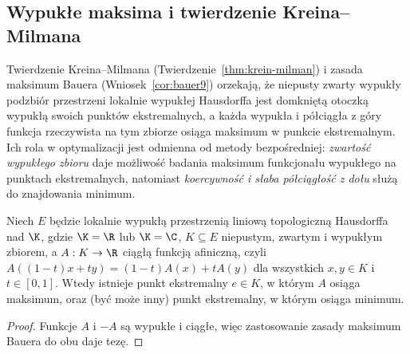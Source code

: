 \subsection{Wypukłe maksima i twierdzenie Kreina--Milmana}

Twierdzenie Kreina--Milmana (Twierdzenie~\ref{thm:krein-milman})
i zasada maksimum Bauera (Wniosek~\ref{cor:bauer9}) orzekają,
że niepusty zwarty wypukły podzbiór przestrzeni lokalnie wypukłej
Hausdorffa jest domkniętą otoczką wypukłą swoich punktów
ekstremalnych, a każda wypukła i półciągła z góry funkcja
rzeczywista na tym zbiorze osiąga maksimum w punkcie ekstremalnym. Ich rola w optymalizacji jest odmienna od metody bezpośredniej:
\emph{zwartość wypukłego zbioru} daje możliwość badania maksimum
funkcjonału wypukłego na punktach ekstremalnych,
natomiast \emph{koercywność i słaba półciągłość z dołu}
służą do znajdowania minimum.

\begin{stwierdzenie}
\label{prop:affine-extreme16}
Niech $E$ będzie lokalnie wypukłą przestrzenią liniową
topologiczną Hausdorffa nad $\K$, gdzie $\K=\R$ lub $\K=\C$,
$K\subseteq E$ niepustym, zwartym i wypukłym zbiorem,
a $A:K\to\R$ ciągłą funkcją afiniczną,
czyli $A((1-t)x+ty)=(1-t)A(x)+tA(y)$
dla wszystkich $x,y\in K$ i $t\in[0,1]$.
Wtedy istnieje punkt ekstremalny $e\in K$, w którym
$A$ osiąga maksimum, oraz (być może inny) punkt ekstremalny,
w którym osiąga minimum.
\end{stwierdzenie}
\begin{proof}
Funkcje $A$ i $-A$ są wypukłe i ciągłe,
więc zastosowanie zasady maksimum Bauera do obu daje tezę.
\end{proof}

